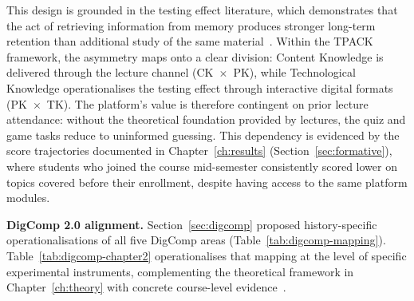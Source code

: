 This design is grounded in the testing effect literature, which demonstrates that the act of retrieving information from memory produces stronger long-term retention than additional study of the same material~\cite{Dunlosky2013, RoedigerButler2011}. Within the TPACK framework, the asymmetry maps onto a clear division: Content Knowledge is delivered through the lecture channel (CK~$\times$~PK), while Technological Knowledge operationalises the testing effect through interactive digital formats (PK~$\times$~TK). The platform's value is therefore contingent on prior lecture attendance: without the theoretical foundation provided by lectures, the quiz and game tasks reduce to uninformed guessing. This dependency is evidenced by the score trajectories documented in Chapter~\ref{ch:results} (Section~\ref{sec:formative}), where students who joined the course mid-semester consistently scored lower on topics covered before their enrollment, despite having access to the same platform modules.

\textbf{DigComp 2.0 alignment.} Section~\ref{sec:digcomp} proposed history-specific operationalisations of all five DigComp areas (Table~\ref{tab:digcomp-mapping}). Table~\ref{tab:digcomp-chapter2} operationalises that mapping at the level of specific experimental instruments, complementing the theoretical framework in Chapter~\ref{ch:theory} with concrete course-level evidence~\cite{Vuorikari2016, Cosgrove2025}.

